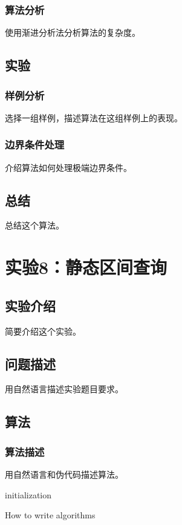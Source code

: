 \documentclass{ctexrep}
\begin{document}
\subsection{算法分析}
使用渐进分析法分析算法的复杂度。

\section{实验}
\subsection{样例分析}
选择一组样例，描述算法在这组样例上的表现。
\subsection{边界条件处理}
介绍算法如何处理极端边界条件。

\section{总结}
总结这个算法。

\chapter{实验8：静态区间查询}
\section{实验介绍}
简要介绍这个实验。

\section{问题描述}
用自然语言描述实验题目要求。

\section{算法}
\subsection{算法描述}
用自然语言和伪代码描述算法。
\begin{algorithm}
\SetAlgoLined
{}
 initialization\;
 \caption{How to write algorithms}
\end{algorithm}
\end{document}
